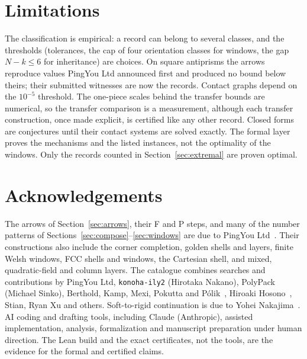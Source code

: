 \documentclass[11pt,a4paper]{article}
\newcommand{\code}[1]{\texttt{\nolinkurl{#1}}}
\theoremstyle{definition}
\theoremstyle{remark}
\begin{document}
\section{Limitations}\label{sec:limits}

The classification is empirical: a record can belong to several classes, and the thresholds (tolerances, the cap of four orientation classes for windows, the gap $N-k\le6$ for inheritance) are choices. On square antiprisms the arrows reproduce values PingYou Ltd announced first and produced no bound below theirs; their submitted witnesses are now the records. Contact graphs depend on the $10^{-5}$ threshold. The one-piece scales behind the transfer bounds are numerical, so the transfer comparison is a measurement, although each transfer construction, once made explicit, is certified like any other record. Closed forms are conjectures until their contact systems are solved exactly. The formal layer proves the mechanisms and the listed instances, not the optimality of the windows. Only the \nProven{} records counted in Section~\ref{sec:extremal} are proven optimal.

\section*{Acknowledgements}
The arrows of Section~\ref{sec:arrows}, their F and P steps, and many of the number patterns of Sections~\ref{sec:compose}--\ref{sec:windows} are due to PingYou Ltd~\cite{pingSixteen,pingArrows}. Their constructions also include the corner completion, golden shells and layers, finite Welsh windows, FCC shells and windows, the Cartesian shell, and mixed, quadratic-field and column layers. The catalogue combines searches and contributions by PingYou Ltd, \code{konoha-ily2} (Hirotaka Nakano), PolyPack (Michael Sinko), Berthold, Kamp, Mexi, Pokutta and P\'olik~\cite{berthold2026}, Hiroaki Hosono~\cite{hosono}, Stian, Ryan Xu and others. Soft-to-rigid continuation is due to Yohei Nakajima~\cite{nakajima2026}. AI coding and drafting tools, including Claude (Anthropic), assisted implementation, analysis, formalization and manuscript preparation under human direction. The Lean build and the exact certificates, not the tools, are the evidence for the formal and certified claims.
\end{document}
